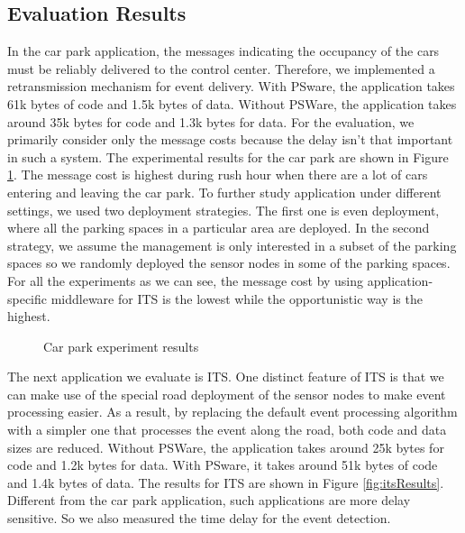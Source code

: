 \subsection{Evaluation Results}
In the car park application, the messages indicating the occupancy of the cars must be reliably delivered to the control center. Therefore, we implemented a retransmission mechanism for event delivery. With PSware, the application takes 61k bytes of code and 1.5k bytes of data. Without PSWare, the application takes around 35k bytes for code and 1.3k bytes for data. For the evaluation, we primarily consider only the message costs because the delay isn't that important in such a system. The experimental results for the car park are shown in Figure \ref{fig:carParkResults}. The message cost is highest during rush hour when there are a lot of cars entering and leaving the car park. To further study application under different settings, we used two deployment strategies. The first one is even deployment, where all the parking spaces in a particular area are deployed. In the second strategy, we assume the management is only interested in a subset of the parking spaces so we randomly deployed the sensor nodes in some of the parking spaces. For all the experiments as we can see, the message cost by using application-specific middleware for ITS is the lowest while the opportunistic way is the highest.

\begin{figure}
\centering
{}
{}
\caption{Car park experiment results}
\label{fig:carParkResults}
\end{figure}

The next application we evaluate is ITS. One distinct feature of ITS is that we can make use of the special road deployment of the sensor nodes to make event processing easier. As a result, by replacing the default event processing algorithm with a simpler one that processes the event along the road, both code and data sizes are reduced. Without PSWare, the application takes around 25k bytes for code and 1.2k bytes for data. With PSware, it takes around 51k bytes of code and 1.4k bytes of data. The results for ITS are shown in Figure \ref{fig:itsResults}. Different from the car park application, such applications are more delay sensitive. So we also measured the time delay for the event detection. %
 
